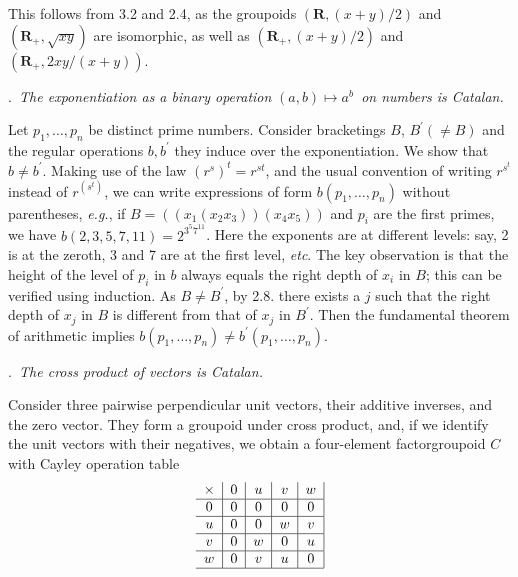 \documentclass[a4paper,reqno]{amsart}\usepackage{amssymb,latexsym}
\theoremstyle{definition}
\theoremstyle{remark}
\numberwithin{equation}{section}
\numberwithin{theorem}{section}
\begin{document}
This follows from 3.2 and 2.4, as the groupoids $(\mathbf{R},\left(
{x+y}\right)  /2)$ and $(\mathbf{R}_{+},\sqrt{xy})$ are isomorphic, as well as
$(\mathbf{R}_{+},\left(  x+y\right)  /2)$ and $({\mathbf{R}_{+}},{2xy/}\left(
x+y\right)  )$.

\bigskip

.\textit{\ The exponentiation as a binary operation }$(a,b)\mapsto
a^{b}$\textit{\ on numbers is Catalan.}

\smallskip

Let $p_{1},\ldots,p_{n}$ be distinct prime numbers. Consider bracketings
$B,\,B^{\prime}(\neq B)$ and the regular operations $b,b^{\prime}$ they induce
over the exponentiation. We show that $b\neq b^{\prime}$. Making use of the
law $(r^{s})^{t}=r^{st}$, and the usual convention of writing $r^{s^{t}}$
instead of $r^{(s^{t})}$, we can write expressions of form $b(p_{1},\ldots,p_{n})$ without parentheses, \textit{e.g.}, if $B=\left(  \left(
x_{1}\left(  x_{2}x_{3}\right)  \right)  \left(  x_{4}x_{5}\right)  \right)  $
and $p_{i}$ are the first primes, we have $b(2,3,5,7,11)=2^{{3^{5}}{7^{11}}}$.
Here the exponents are at different levels: say, 2 is at the zeroth, 3 and 7
are at the first level, \textit{etc}. The key observation is that the height
of the level of $p_{i}$ in $b$ always equals the right depth of $x_{i}$ in
$B$; this can be verified using induction. As $B\neq B^{\prime}$, by 2.8.
there exists a $j$ such that the right depth of $x_{j}$ in $B$ is different
from that of $x_{j}$ in $B^{\prime}$. Then the fundamental theorem of
arithmetic implies $b(p_{1},\dots,p_{n})\neq b^{\prime}(p_{1},\ldots,p_{n})$.

\bigskip

.\textit{\ The cross product of vectors is Catalan.}

\smallskip

Consider three pairwise perpendicular unit vectors, their additive inverses,
and the zero vector. They form a groupoid under cross product, and, if we
identify the unit vectors with their negatives, we obtain a four-element
factorgroupoid $C$ with Cayley operation table
\[
 \setlength{\tabcolsep}{0.2cm}\begin{tabular}
[c]{c|c|c|c|c|}$\times$ & $0$ & $u$ & $v$ & $w$\\\hline
$0$ & $0$ & $0$ & $0$ & $0$\\\hline
$u$ & $0$ & $0$ & $w$ & $v$\\\hline
$v$ & $0$ & $w$ & $0$ & $u$\\\hline
$w$ & $0$ & $v$ & $u$ & $0$\\\hline
\end{tabular}
\]
\end{document}
